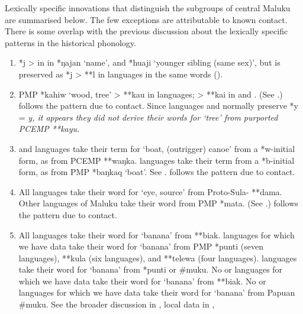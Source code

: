 \clearpage
{}
Lexically specific innovations that distinguish the subgroups
of central Maluku are summarised below.
The few exceptions are attributable to known contact.
There is some overlap with the previous discussion about the
lexically specific patterns in the historical phonology.

\begin{enumerate}
	\item	*j > {\0} in  in *ŋajan ‘name’,
				and *huaji ‘younger sibling (same sex)’,
				but is preserved as *j > **l in  languages in
				the same words ().
	\item	PMP *kahiw ‘wood,
				tree’ > **kau in  languages; > **kai in  and .
				(See .)  follows the  pattern due to contact.
				Since  languages 
				and  normally preserve *y = \it{y},
				it appears they did not derive their words for
				‘tree’ from purported PCEMP **kayu.
	\item	{}
				and  languages take their term for
				‘boat, (outrigger) canoe’ from a *w-initial form,
				as from PCEMP **waŋka.
				 languages take their term from a *b-initial
				form, as from PMP *baŋkaq ‘boat’.
				See .
				 follows the  pattern due to contact.
	\item	All  languages take their word for ‘eye,
				source’ from Proto-Sula- **dama.
				Other  languages of Maluku take their word from PMP *mata. (See .)
				 follows the  pattern due to contact.
	\item	All  languages take their word for ‘banana’ from **biak.
				 languages for which we have data take their
				word for ‘banana’ from PMP *punti (seven languages),
				**kula (six languages), and **telewa (four languages).
				 languages take their word for ‘banana’
				from *punti or {\#}muku.
				No  or  languages
				for which we have data take their word for ‘banana’ from **biak.
				No  or  languages for which we
				have data take their word for ‘banana’ from Papuan {\#}muku.
				See the broader discussion in ,
				local data in ,

\end{enumerate}
